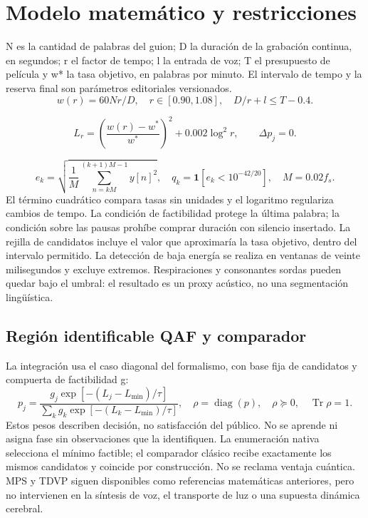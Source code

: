 \documentclass[10pt,a4paper]{article}
\begin{document}
\section{Modelo matemático y restricciones}
N es la cantidad de palabras del guion; D la duración de la grabación continua, en segundos; r el factor de tempo; l la entrada de voz; T el presupuesto de película y w* la tasa objetivo, en palabras por minuto. El intervalo de tempo y la reserva final son parámetros editoriales versionados.
\begin{equation}w(r)=60Nr/D,\quad r\in[0.90,1.08],\quad D/r+l\leq T-0.4.\end{equation}

\begin{equation}L_r=\left(\frac{w(r)-w^*}{w^*}\right)^2+0.002\log^2r,\qquad \Delta p_j=0.\end{equation}

\begin{equation}e_k=\sqrt{\frac1M\sum_{n=kM}^{(k+1)M-1}y[n]^2},\quad q_k=\mathbf1[e_k<10^{-42/20}],\quad M=0.02f_s.\end{equation}
El término cuadrático compara tasas sin unidades y el logaritmo regulariza cambios de tempo. La condición de factibilidad protege la última palabra; la condición sobre las pausas prohíbe comprar duración con silencio insertado. La rejilla de candidatos incluye el valor que aproximaría la tasa objetivo, dentro del intervalo permitido. La detección de baja energía se realiza en ventanas de veinte milisegundos y excluye extremos. Respiraciones y consonantes sordas pueden quedar bajo el umbral: el resultado es un proxy acústico, no una segmentación lingüística.
\subsection{Región identificable QAF y comparador}
La integración usa el caso diagonal del formalismo, con base fija de candidatos y compuerta de factibilidad g:
\begin{equation}
p_j=\frac{g_j\exp[-(L_j-L_{\min})/\tau]}{\sum_k g_k\exp[-(L_k-L_{\min})/\tau]},\quad\rho=\operatorname{diag}(p),\quad\rho\succeq0,\quad\operatorname{Tr}\rho=1.
\end{equation}
Estos pesos describen decisión, no satisfacción del público. No se aprende ni asigna fase sin observaciones que la identifiquen. La enumeración nativa selecciona el mínimo factible; el comparador clásico recibe exactamente los mismos candidatos y coincide por construcción. No se reclama ventaja cuántica. MPS y TDVP siguen disponibles como referencias matemáticas anteriores, pero no intervienen en la síntesis de voz, el transporte de luz o una supuesta dinámica cerebral.
\end{document}
